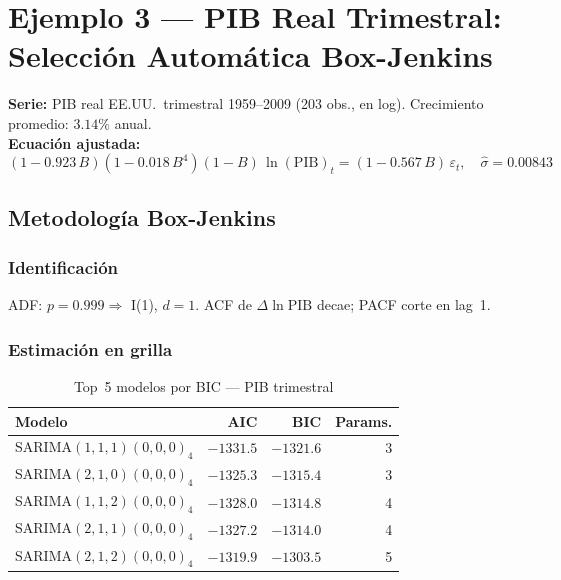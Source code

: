 \documentclass[11pt, a4paper]{article}
\begin{document}
\newpage

\section{Ejemplo 3 --- PIB Real Trimestral: Selecci\'on Autom\'atica Box-Jenkins}

\begin{tcolorbox}[teorema, title={Modelo ganador por BIC: SARIMA$(1,1,1)(1,0,0)_4$}]
\textbf{Serie:} PIB real EE.UU.\ trimestral 1959--2009 (203 obs., en log).
Crecimiento promedio: $3.14\%$ anual.\\[4pt]
\textbf{Ecuaci\'on ajustada:}
\[
  (1-0.923\,B)(1-0.018\,B^4)(1-B)\,\ln(\text{PIB})_t
  = (1-0.567\,B)\,\varepsilon_t,\quad\hat\sigma=0.00843
\]
\end{tcolorbox}

\subsection{Metodolog\'ia Box-Jenkins}

\subsubsection{Identificaci\'on}
ADF: $p=0.999 \Rightarrow$ I(1), $d=1$. ACF de $\Delta\ln\text{PIB}$ decae; PACF corte en lag~1.
\subsubsection{Estimaci\'on en grilla}

\begin{table}[H]\centering
\caption{Top~5 modelos por BIC --- PIB trimestral}
\renewcommand{\arraystretch}{1.3}
\begin{tabular}{lrrr}
\toprule
\rowcolor{navy!12}\color{navy}Modelo &
\color{navy}AIC & \color{navy}BIC & \color{navy}Params.\\
\midrule
\rowcolor{verde!10}SARIMA$(1,1,1)(0,0,0)_4$ & $-1331.5$ & $-1321.6$ & 3\\
SARIMA$(2,1,0)(0,0,0)_4$ & $-1325.3$ & $-1315.4$ & 3\\
SARIMA$(1,1,2)(0,0,0)_4$ & $-1328.0$ & $-1314.8$ & 4\\
SARIMA$(2,1,1)(0,0,0)_4$ & $-1327.2$ & $-1314.0$ & 4\\
SARIMA$(2,1,2)(0,0,0)_4$ & $-1319.9$ & $-1303.5$ & 5\\
\bottomrule
\end{tabular}
\end{table}
\end{document}
